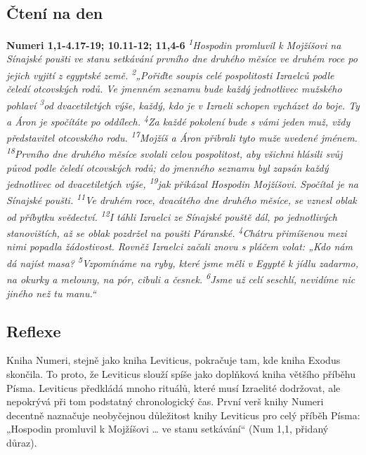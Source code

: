 \documentclass[11pt]{article}
\begin{document}
\subsection*{Čtení na den}
\textbf{Numeri 1,1-4.17-19; 10.11-12; 11,4-6}
\newline
\textit{
\textsuperscript{1}Hospodin promluvil k Mojžíšovi na Sínajské poušti ve stanu setkávání prvního dne druhého měsíce ve druhém roce po jejich vyjití z egyptské země.
\textsuperscript{2}„Pořiďte soupis celé pospolitosti Izraelců podle čeledí otcovských rodů. Ve jmenném seznamu bude každý jednotlivec mužského pohlaví
\textsuperscript{3}od dvacetiletých výše, každý, kdo je v Izraeli schopen vycházet do boje. Ty a Áron je spočítáte po oddílech.
\textsuperscript{4}Za každé pokolení bude s vámi jeden muž, vždy představitel otcovského rodu.
\newline
\newline
\textsuperscript{17}Mojžíš a Áron přibrali tyto muže uvedené jménem.
\textsuperscript{18}Prvního dne druhého měsíce svolali celou pospolitost, aby všichni hlásili svůj původ podle čeledí otcovských rodů; do jmenného seznamu byl zapsán každý jednotlivec od dvacetiletých výše,
\textsuperscript{19}jak přikázal Hospodin Mojžíšovi. Spočítal je na Sínajské poušti.
\newline
\newline
\textsuperscript{11}Ve druhém roce, dvacátého dne druhého měsíce, se vznesl oblak od příbytku svědectví.
\textsuperscript{12}I táhli Izraelci ze Sínajské pouště dál, po jednotlivých stanovištích, až se oblak pozdržel na poušti Páranské.
\newline
\newline
\textsuperscript{4}Chátru přimíšenou mezi nimi popadla žádostivost. Rovněž Izraelci začali znovu s pláčem volat: „Kdo nám dá najíst masa?
\textsuperscript{5}Vzpomínáme na ryby, které jsme měli v Egyptě k jídlu zadarmo, na okurky a melouny, na pór, cibuli a česnek.
\textsuperscript{6}Jsme už celí seschlí, nevidíme nic jiného než tu manu.“
}

\subsection*{Reflexe}
Kniha Numeri, stejně jako kniha Leviticus, pokračuje tam, kde kniha Exodus skončila. To proto, že Leviticus
slouží spíše jako doplňková kniha většího příběhu Písma. Leviticus předkládá mnoho rituálů, které musí
Izraelité dodržovat, ale nepokrývá při tom podstatný chronologický čas. První verš knihy Numeri decentně
naznačuje neobyčejnou důležitost knihy Leviticus pro celý příběh Písma: „Hospodin promluvil k Mojžíšovi
… ve stanu setkávání“ (Num 1,1, přidaný důraz).
\end{document}

